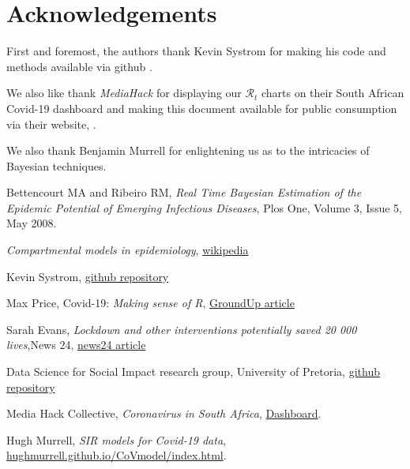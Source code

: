 \documentclass[11pt]{article}
\begin{document}
\section{Acknowledgements}

First and foremost, the authors thank Kevin Systrom for making his code and methods
available via github \cite{systrom}.

We also like thank {\it MediaHack} for displaying our $\mathcal{R}_t$ charts
on their South African Covid-19 dashboard and making this document available for 
public consumption via their website, \cite{mediahack}.

We also thank Benjamin Murrell for enlightening us as to the intricacies of Bayesian techniques.

\begin{thebibliography}{99}

Bettencourt MA and Ribeiro RM, {\em Real Time Bayesian Estimation of the Epidemic Potential of Emerging Infectious Diseases}, Plos One, Volume 3, Issue 5, May 2008.

 {\em Compartmental models in epidemiology},
\href{http://en.wikipedia.org/wiki/Compartmental_models_in_epidemiology}{wikipedia}

 Kevin Systrom, 
\href{https://github.com/k-sys/covid-19/blob/master/Realtime%20Rt%20mcmc.ipynb}{github repository}

 Max Price, Covid-19: {\em Making sense of R}, 
\href{https://www.groundup.org.za/article/covid-19-making-sense-of-r}{GroundUp article}

 Sarah Evans, {\em Lockdown and other interventions potentially saved 20 000 lives},News 24, \href{https://www.news24.com/SouthAfrica/News/lockdown-and-other-interventions-potentially-saved-20-000-lives-top-scientist-20200513}{news24 article}

 Data Science for Social Impact research group, University of Pretoria, \href{https://raw.githubusercontent.com/dsfsi/covid19za/master/data/covid19za_provincial_cumulative_timeline_confirmed.csv} {github repository}
 
Media Hack Collective, {\em Coronavirus in South Africa},
\href{https://mediahack.co.za/datastories/coronavirus/dashboard/}{Dashboard}.

Hugh Murrell, {\em SIR models for Covid-19 data},
\href{https://hughmurrell.github.io/CoVmodel/index.html}{hughmurrell.github.io/CoVmodel/index.html}.

\end{thebibliography}
\end{document}

